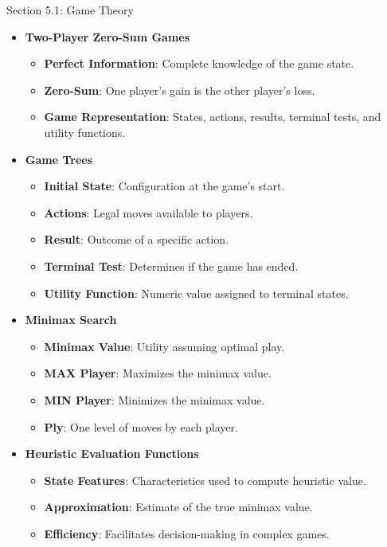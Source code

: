 \begin{notes}{Section 5.1: Game Theory}
\begin{highlight}
        \begin{itemize}
            \item \textbf{Two-Player Zero-Sum Games}
                \begin{itemize}
                    \item \textbf{Perfect Information}: Complete knowledge of the game state.
                    \item \textbf{Zero-Sum}: One player's gain is the other player's loss.
                    \item \textbf{Game Representation}: States, actions, results, terminal tests, and utility functions.
                \end{itemize}
            \item \textbf{Game Trees}
                \begin{itemize}
                    \item \textbf{Initial State}: Configuration at the game's start.
                    \item \textbf{Actions}: Legal moves available to players.
                    \item \textbf{Result}: Outcome of a specific action.
                    \item \textbf{Terminal Test}: Determines if the game has ended.
                    \item \textbf{Utility Function}: Numeric value assigned to terminal states.
                \end{itemize}
            \item \textbf{Minimax Search}
                \begin{itemize}
                    \item \textbf{Minimax Value}: Utility assuming optimal play.
                    \item \textbf{MAX Player}: Maximizes the minimax value.
                    \item \textbf{MIN Player}: Minimizes the minimax value.
                    \item \textbf{Ply}: One level of moves by each player.
                \end{itemize}
            \item \textbf{Heuristic Evaluation Functions}
                \begin{itemize}
                    \item \textbf{State Features}: Characteristics used to compute heuristic value.
                    \item \textbf{Approximation}: Estimate of the true minimax value.
                    \item \textbf{Efficiency}: Facilitates decision-making in complex games.
                \end{itemize}
        \end{itemize}
    \end{highlight}
\end{notes}


